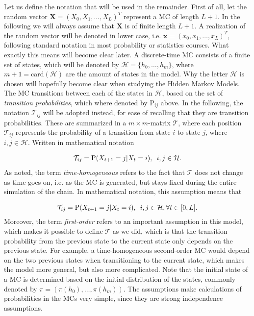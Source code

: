 \documentclass{article}
\begin{document}
Let us define the notation that will be used in the remainder. First of all, let the random vector $\mathbf{X} = (X_0, X_1, \ldots, X_L)^T$ represent a MC of length $L+1$. In the following we will always assume that $\mathbf{X}$ is of finite length $L+1$. A realization of the random vector will be denoted in lower case, i.e. $\mathbf{x} = (x_0, x_1, \ldots, x_L)^T$, following standard notation in most probability or statistics courses. What exactly this means will become clear later. A discrete-time MC consists of a finite set of states, which will be denoted by $\mathcal{H} = \{h_0, \ldots, h_m\}$, where $m+1 = \text{card}(\mathcal{H})$ are the amount of states in the model. Why the letter $\mathcal{H}$ is chosen will hopefully become clear when studying the Hidden Markov Models. The MC transitions between each of the states in $\mathcal{H}$, based on the set of \textit{transition probabilities}, which where denoted by $\text{P}_{ij}$ above. In the following, the notation $\mathcal{T}_{ij}$ will be adopted instead, for ease of recalling that they are transition probabilities. These are summarized in a $m \times m$-matrix $\mathcal{T}$, where each position $\mathcal{T}_{ij}$ represents the probability of a transition from state $i$ to state $j$, where $i, j \in \mathcal{H}$. Written in mathematical notation

\begin{equation*}
        \mathcal{T}_{ij} = \text{P}(X_{t+1} = j|X_{t} = i), \hspace{0.5em} i,j \in \mathcal{H}. 
\end{equation*}
As noted, the term \textit{time-homogeneous} refers to the fact that $\mathcal{T}$ does not change as time goes on, i.e. as the MC is generated, but stays fixed during the entire simulation of the chain. In mathematical notation, this assumption means that

\begin{equation*}
    \mathcal{T}_{ij} = \text{P}(X_{t+1} = j|X_{t} = i), \hspace{0.5em} i,j \in \mathcal{H}, \forall t \in [0,L].
\end{equation*}
Moreover, the term \textit{first-order} refers to an important assumption in this model, which makes it possible to define $\mathcal{T}$ as we did, which is that the transition probability from the previous state to the current state only depends on the previous state. For example, a time-homogeneous second-order MC would depend on the two previous states when transitioning to the current state, which makes the model more general, but also more complicated. Note that the initial state of a MC is determined based on the initial distribution of the states, commonly denoted by $\pi = (\pi(h_0), \ldots, \pi(h_m))$. The assumptions make calculations of probabilities in the MCs very simple, since they are strong independence assumptions. 
\end{document}
